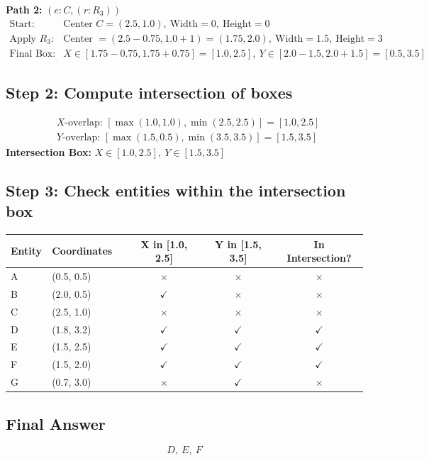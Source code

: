 \documentclass[11pt]{article}
\numberwithin{figure}{section}
\begin{document}
\textbf{Path 2: }$(e:C, (r:R_3))$  
\begin{align*}
\text{Start: } & \text{Center } C = (2.5, 1.0),\ \text{Width}=0,\ \text{Height}=0 \\
\text{Apply } R_3: & \text{Center } = (2.5-0.75, 1.0+1) = (1.75, 2.0),\ \text{Width}=1.5,\ \text{Height}=3 \\
\text{Final Box: } & X \in [1.75 - 0.75, 1.75 + 0.75] = [1.0, 2.5],\ Y \in [2.0 - 1.5, 2.0 + 1.5] = [0.5, 3.5]
\end{align*}

\subsection*{Step 2: Compute intersection of boxes}
$$
\begin{aligned}
&X\text{-overlap: } [\max(1.0, 1.0), \min(2.5, 2.5)] = [1.0, 2.5] \\
&Y\text{-overlap: } [\max(1.5, 0.5), \min(3.5, 3.5)] = [1.5, 3.5]
\end{aligned}
$$
\textbf{Intersection Box: }$X \in [1.0, 2.5],\ Y \in [1.5, 3.5]$

\subsection*{Step 3: Check entities within the intersection box}

\begin{tabularx}{\textwidth}{l|ll|cc|c}
\toprule
\textbf{Entity} & \textbf{Coordinates} & & \textbf{X in [1.0, 2.5]} & \textbf{Y in [1.5, 3.5]} & \textbf{In Intersection?} \\
\midrule
A & (0.5, 0.5) & & $\times$ & $\times$ & $\times$ \\
B & (2.0, 0.5) & & $\checkmark$ & $\times$ & $\times$ \\
C & (2.5, 1.0) & & $\times$ & $\times$ & $\times$ \\
D & (1.8, 3.2) & & $\checkmark$ & $\checkmark$ & $\checkmark$ \\
E & (1.5, 2.5) & & $\checkmark$ & $\checkmark$ & $\checkmark$ \\
F & (1.5, 2.0) & & $\checkmark$ & $\checkmark$ & $\checkmark$ \\
G & (0.7, 3.0) & & $\times$ & $\checkmark$ & $\times$ \\
\bottomrule
\end{tabularx}

\subsection*{Final Answer}
$$
\boxed{D,\ E,\ F}
$$
\end{document}
